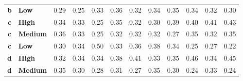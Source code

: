\documentclass[mathematics,article,submit,moreauthors,pdftex]{mdpi}
\begin{document}
\begin{table}[H]
\begin{tabular}{@{}clrrrrrrrrrr@{}}
\textbf{b}     & \textbf{Low}       & 0.29                               & 0.25                               & 0.33                               & 0.36                               & 0.32                               & 0.34                               & 0.35                               & 0.34                               & 0.32                               & 0.30                                \\
\rowcolor[HTML]{D9D9D9} 
\textbf{c}     & \textbf{High}      & 0.34                               & 0.33                               & 0.25                               & 0.35                               & 0.32                               & 0.30                               & 0.39                               & 0.40                               & 0.41                               & 0.43                                \\
\rowcolor[HTML]{D9D9D9} 
\textbf{c}     & \textbf{Medium}    & 0.36                               & 0.33                               & 0.25                               & 0.32                               & 0.32                               & 0.32                               & 0.27                               & 0.35                               & 0.32                               & 0.35                                \\
\rowcolor[HTML]{D9D9D9} 
\textbf{c}     & \textbf{Low}       & 0.30                               & 0.34                               & 0.50                               & 0.33                               & 0.36                               & 0.38                               & 0.34                               & 0.25                               & 0.27                               & 0.22                                \\
\textbf{d}     & \textbf{High}      & 0.32                               & 0.34                               & 0.34                               & 0.38                               & 0.41                               & 0.33                               & 0.35                               & 0.46                               & 0.34                               & 0.45                                \\
\textbf{d}     & \textbf{Medium}    & 0.35                               & 0.30                               & 0.28                               & 0.31                               & 0.27                               & 0.35                               & 0.30                               & 0.24                               & 0.33                               & 0.24                                \\

\end{tabular}
\end{table}
\end{document}
